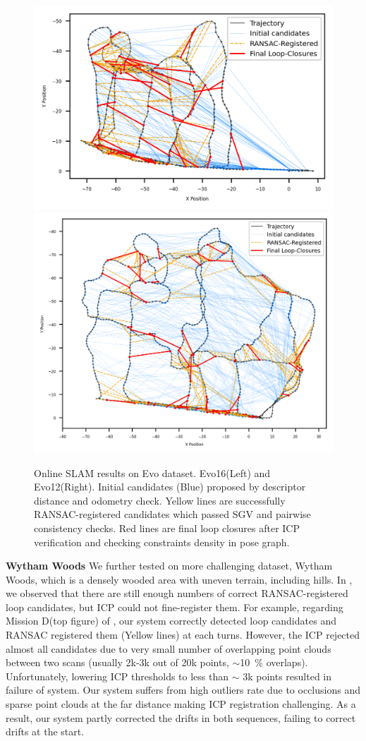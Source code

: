 \begin{figure}[htbp]
  \centering
  \includegraphics[width=0.53\columnwidth]{pics/exp_2_1_evo16_online2.png}
  \includegraphics[width=0.46\columnwidth]{pics/exp_2_1_evo12_online.png}
  \caption{Online SLAM results on Evo dataset. Evo16(Left) and Evo12(Right). Initial candidates (Blue) proposed by descriptor distance and odometry check. Yellow lines are successfully RANSAC-registered candidates which passed SGV and pairwise consistency checks. Red lines are final loop closures after ICP verification and checking constraints density in pose graph.}
  \label{fig:exp_2_1_evo_online}
\end{figure}
\newline
\textbf{Wytham Woods}\hspace{0.5em} We further tested on more challenging dataset, Wytham Woods, which is a densely wooded area with uneven terrain, including hills. In , we observed that there are still enough numbers of correct RANSAC-registered loop candidates, but ICP could not fine-register them. For example, regarding Mission D(top figure) of , our system correctly detected loop candidates and RANSAC registered them (Yellow lines) at each turns. However, the ICP rejected almost all candidates due to very small number of overlapping point clouds between two scans (usually 2k-3k out of 20k points, $\sim$\SI{10}{\percent} overlaps). Unfortunately, lowering ICP thresholds to less than $\sim$ 3k points resulted in failure of system. Our system suffers from high outliers rate due to occlusions and sparse point clouds at the far distance making ICP registration challenging. As a result, our system partly corrected the drifts in both sequences, failing to correct drifts at the start. 
